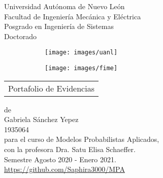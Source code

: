 \thispagestyle{empty}
\begin{scshape}
\begin{center}
	{\Large{Universidad Autónoma de Nuevo León}} \\[5mm]
	{\large{Facultad de Ingeniería Mecánica y Eléctrica}} \\[5mm]
	{\large{Posgrado en Ingeniería de Sistemas}} \\[5 mm]
	{\large{Doctorado}}
	\vskip16mm
	\begin{figure}[h!]
		\centering
		\begin{subfigure}{0.3\linewidth}
			\texttt{[image: images/uanl]}
		\end{subfigure}
		\hspace{15 mm}
		\begin{subfigure}{0.2\linewidth}
			\texttt{[image: images/fime]}
		\end{subfigure}
	\end{figure}
	\vskip16mm
	\begin{tabular}{p{11cm}}
		\centering
		{\large Portafolio de Evidencias}
	\end{tabular}
	\vskip7mm
	{de}\\[7mm]
	{\large Gabriela Sánchez Yepez}\\[3mm]
	{1935064}\\[7 mm]
	{para el curso de Modelos Probabilistas Aplicados,}\\[3mm]
	{con la profesora Dra. Satu Elisa Schaeffer.}\\[3mm]
	Semestre Agosto 2020 - Enero 2021. \\ [5 mm]
	\url{https://github.com/Saphira3000/MPA}
	\vfill
\end{center}
\end{scshape}